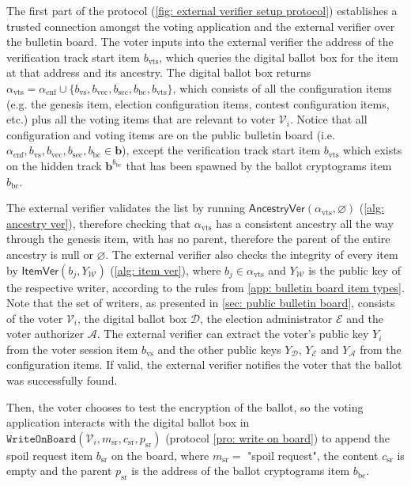 The first part of the protocol (\cref{fig: external verifier setup protocol}) establishes a trusted connection amongst the voting application and the external verifier over the bulletin board. The voter inputs into the external verifier the address of the verification track start item $b_\mathrm{vts}$, which queries the digital ballot box for the item at that address and its ancestry. The digital ballot box returns $\alpha_\mathrm{vts} = \alpha_\mathrm{cnf} \cup \{ b_\mathrm{vs}, b_\mathrm{vec}, b_\mathrm{sec}, b_\mathrm{bc}, b_\mathrm{vts} \}$, which consists of all the configuration items (e.g. the genesis item, election configuration items, contest configuration items, etc.) plus all the voting items that are relevant to voter $\mathcal{V}_i$. Notice that all configuration and voting items are on the public bulletin board (i.e. $\alpha_\mathrm{cnf}, b_\mathrm{vs}, b_\mathrm{vec}, b_\mathrm{sec}, b_\mathrm{bc} \in \boldsymbol{b}$), except the verification track start item $b_\mathrm{vts}$ which exists on the hidden track $\boldsymbol{b}^{b_\mathrm{bc}}$ that has been spawned by the ballot cryptograms item $b_\mathrm{bc}$.

The external verifier validates the list by running $\mathsf{AncestryVer}(\alpha_\mathrm{vts}, \varnothing)$ (\cref{alg: ancestry ver}), therefore checking that $\alpha_\mathrm{vts}$ has a consistent ancestry all the way through the genesis item, with has no parent, therefore the parent of the entire ancestry is null or $\varnothing$. The external verifier also checks the integrity of every item by $\mathsf{ItemVer}(b_j, Y_\mathcal{W})$ (\cref{alg: item ver}), where $b_j \in \alpha_\mathrm{vts}$ and $Y_\mathcal{W}$ is the public key of the respective writer, according to the rules from \cref{app: bulletin board item types}. Note that the set of writers, as presented in \cref{sec: public bulletin board}, consists of the voter $\mathcal{V}_i$, the digital ballot box $\mathcal{D}$, the election administrator $\mathcal{E}$ and the voter authorizer $\mathcal{A}$. The external verifier can extract the voter's public key $Y_i$ from the voter session item $b_\mathrm{vs}$ and the other public keys $Y_\mathcal{D}$, $Y_\mathcal{E}$ and $Y_\mathcal{A}$ from the configuration items. If valid, the external verifier notifies the voter that the ballot was successfully found.

Then, the voter chooses to test the encryption of the ballot, so the voting application interacts with the digital ballot box in $\mathtt{WriteOnBoard}(\mathcal{V}_i, m_\mathrm{sr}, c_\mathrm{sr}, p_\mathrm{sr})$ (protocol \ref{pro: write on board}) to append the spoil request item $b_\mathrm{sr}$ on the board, where $m_\mathrm{sr} = $ "spoil request", the content $c_\mathrm{sr}$ is empty and the parent $p_\mathrm{sr}$ is the address of the ballot cryptograms item $b_\mathrm{bc}$.

